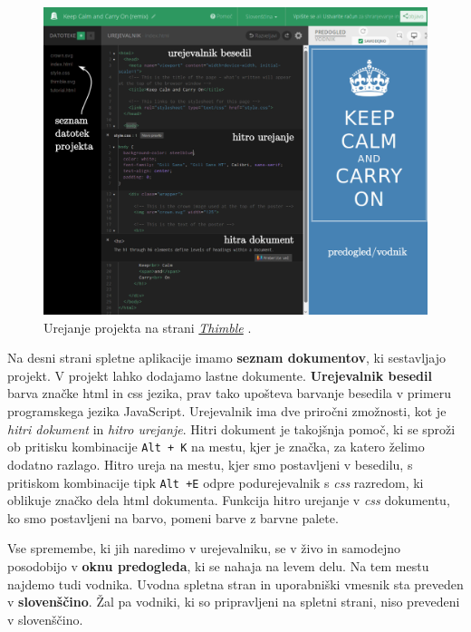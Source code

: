 \begin{figure}[h!]
  \centering
    \includegraphics [width=1\linewidth, keepaspectratio =
   1] {./images/sc_web/thimble_saup-v02.jpg}
   \caption{Urejanje projekta na strani
     \emph{\href{https://thimble.mozilla.org/sl/}{Thimble}}
     \cite{web:thimble}.}
   \label{fig:web:thimble:webapp}
 \end{figure}

 Na desni strani spletne aplikacije imamo \textbf{seznam dokumentov},
 ki sestavljajo projekt. V projekt lahko dodajamo lastne dokumente.
 \textbf{Urejevalnik besedil} barva značke html in css jezika, prav
 tako upošteva barvanje besedila v primeru programskega jezika
 JavaScript. Urejevalnik ima dve priročni zmožnosti, kot je
 \emph{hitri dokument} in \emph{hitro urejanje}. Hitri dokument je
 takojšnja pomoč, ki se sproži ob pritisku kombinacije \texttt{Alt +
   K} na mestu, kjer je značka, za katero želimo dodatno razlago. Hitro
 ureja na mestu, kjer smo postavljeni v besedilu, s pritiskom
 kombinacije tipk \texttt{Alt  +E} odpre podurejevalnik s \emph{css}
 razredom, ki oblikuje značko dela html dokumenta. Funkcija hitro
 urejanje v \emph{css} dokumentu, ko smo postavljeni na barvo, pomeni
 barve z barvne palete.

 Vse spremembe, ki jih naredimo v urejevalniku, se v živo in samodejno
 posodobijo v \textbf{oknu predogleda}, ki se nahaja na levem delu. Na
 tem mestu najdemo tudi vodnika. Uvodna spletna stran in uporabniški
 vmesnik sta preveden v \textbf{slovenščino}. Žal pa vodniki, ki so
  pripravljeni na spletni strani, niso prevedeni v slovenščino.

